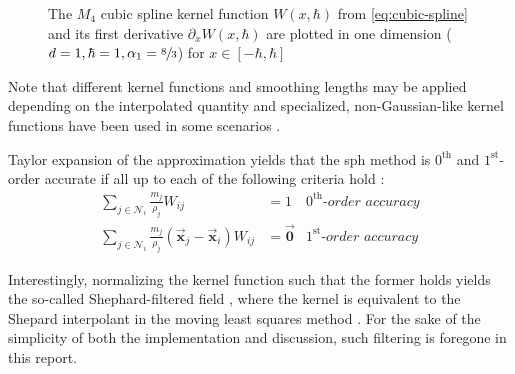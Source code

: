 \documentclass[conference]{IEEEtran}
\newcommand\vek[1]{\vec{\bm{#1}}}
\newcommand\br[1]{\left(#1\right)}
\begin{document}
\begin{figure}
  \centering
  \caption{The $M_4$ cubic spline kernel function $W\br{x, \hbar}$ from \autoref{eq:cubic-spline} and its first derivative $\partial_x W\br{x, \hbar}$ are plotted in one dimension ($d=1, \hbar=1, \alpha_1=\sfrac{8}{3}$) for $x\in[-\hbar,\hbar]$}\label{fig:cubic-spline}
\end{figure}


Note that different kernel functions and smoothing lengths may be applied depending on the interpolated quantity and specialized, non-Gaussian-like kernel functions have been used in some scenarios \autocites{mueller-sph}{teschner-surf-tens-neg-kernel}. 

Taylor expansion of the approximation yields that the \ac{sph} method is $0^\text{th}$ and $1^\text{st}$-order accurate if all up to each of the following criteria hold \cite{tutorial2019}:
\begin{subequations}
  \label{eq:consistency-criteria}
  \begin{align}
    \sum_{j\in\mathcal{N}_i} \frac{m_j}{\rho_j} W_{ij} &= 1 &\textit{$0^\text{th}$-order accuracy}\label{eq:acc-0th-order}\\
    \sum_{j\in\mathcal{N}_i} \frac{m_j}{\rho_j} \br{\vek{x}_j - \vek{x}_i} W_{ij} &= \vek{0} &\textit{$1^\text{st}$-order accuracy}
  \end{align}
\end{subequations}


Interestingly, normalizing the kernel function such that the former holds yields the so-called Shephard-filtered field \cite{survey2022}, where the kernel is equivalent to the Shepard interpolant in the moving least squares method \cite{duarte-meshless}.
For the sake of the simplicity of both the implementation and discussion, such filtering is foregone in this report.
\end{document}
